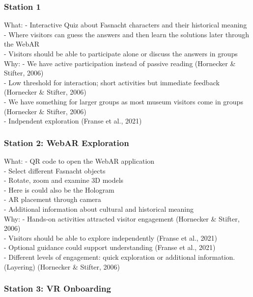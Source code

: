 \subsubsection{Station 1}
What:
- Interactive Quiz about Fasnacht characters and their historical meaning
\\
- Where visitors can guess the answers and then learn the solutions later through the WebAR
\\
- Visitors should be able to participate alone or discuss the answers in groups
\\
Why:
- We have active participation instead of passive reading (Hornecker \& Stifter, 2006)
\\
- Low threshold for interaction; short activities but immediate feedback (Hornecker \& Stifter, 2006)
\\
- We have something for larger groups as most museum visitors come in groups (Hornecker \& Stifter, 2006)
\\
- Indpendent exploration (Franse et al., 2021)
\\
\subsubsection{Station 2: WebAR Exploration}

What:
- QR code to open the WebAR application
\\
- Select different Fasnacht objects
\\
- Rotate, zoom and examine 3D models
\\
- Here is could also be the Hologram
\\
- AR placement through camera
\\
- Additional information about cultural and historical meaning
\\
Why:
- Hands-on activities attracted visitor engagement (Hornecker \& Stifter, 2006)
\\
- Visitors should be able to explore independently (Franse et al., 2021)
\\
- Optional guidance could support understanding (Franse et al., 2021)
\\
- Different levels of engagement: quick exploration or additional information. (Layering) (Hornecker \& Stifter, 2006)
\\
\subsubsection{Station 3: VR Onboarding}

